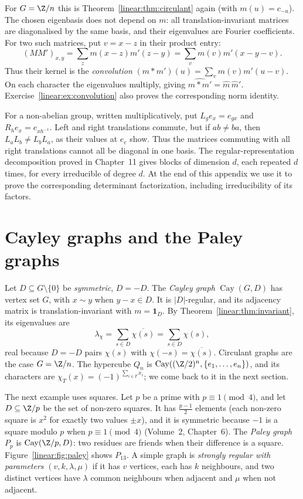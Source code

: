 For $G=\Z/n$ this is Theorem~\ref{linear:thm:circulant} again (with $m(u)=c_{-u}$). The chosen eigenbasis does not
depend on $m$: all translation-invariant matrices are diagonalised by the same basis, and their eigenvalues are Fourier
coefficients. For two such matrices, put $v=x-z$ in their product entry:
\[
(MM')_{x,y}=\sum_zm(x-z)m'(z-y)
=\sum_vm(v)m'(x-y-v).
\]
Thus their kernel is the \emph{convolution} $(m*m')(u)=\sum_vm(v)m'(u-v)$.
On each character the eigenvalues multiply, giving
$\widehat{m*m'}=\hat m\,\hat m'$. Exercise~\ref{linear:ex:convolution}
also proves the corresponding norm identity.

\begin{remark}
For a non-abelian group, written multiplicatively, put $L_g e_x=e_{gx}$ and
$R_h e_x=e_{xh^{-1}}$. Left and right translations commute, but if $ab\ne ba$,
then $L_aL_b\ne L_bL_a$, as their values at $e_e$ show. Thus the matrices
commuting with all right translations cannot all be diagonal in one basis.
The regular-representation decomposition proved in Chapter~11 gives blocks
of dimension $d$, each repeated $d$ times, for every irreducible of degree $d$.
At the end of this appendix we use it to prove the corresponding determinant
factorization, including irreducibility of its factors.
\end{remark}

\section{Cayley graphs and the Paley graphs}

Let $D\subseteq G\setminus\{0\}$ be \emph{symmetric}, $D=-D$. The \emph{Cayley graph} $\operatorname{Cay}(G,D)$ has vertex set $G$,
with $x\sim y$ when $y-x\in D$. It is $|D|$-regular, and its adjacency matrix is translation-invariant with $m=\mathbf 1_D$. By
Theorem~\ref{linear:thm:invariant}, its eigenvalues are
\[
\lambda_\chi=\sum_{s\in D}\overline{\chi(s)}=\sum_{s\in D}\chi(s),
\]
real because $D=-D$ pairs $\chi(s)$ with $\chi(-s)=\overline{\chi(s)}$. Circulant graphs are the case $G=\Z/n$. The hypercube
$Q_n$ is $\operatorname{Cay}((\Z/2)^n,\{e_1,\dots,e_n\})$, and its characters are $\chi_T(x)=(-1)^{\sum_{i\in T}x_i}$; we come back to
it in the next section.

The next example uses squares. Let $p$ be a prime with $p\equiv1\pmod4$, and let $D\subseteq\Z/p$ be the set of non-zero
squares. It has $\frac{p-1}2$ elements (each non-zero square is $x^2$ for exactly two values $\pm x$), and it is symmetric because
$-1$ is a square modulo $p$ when $p\equiv1\pmod4$ (Volume~2, Chapter~6). The \emph{Paley graph} $P_p$ is $\operatorname{Cay}(\Z/p,D)$:
two residues are friends when their difference is a square. Figure~\ref{linear:fig:paley} shows $P_{13}$.
A simple graph is \emph{strongly regular with parameters} $(v,k,\lambda,\mu)$
if it has $v$ vertices, each has $k$ neighbours, and two distinct vertices
have $\lambda$ common neighbours when adjacent and $\mu$ when not adjacent.

